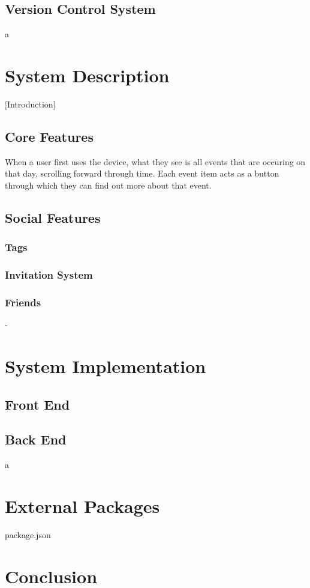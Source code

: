 \documentclass[11pt]{article}
\begin{document}
\subsection {Version Control System}
a
\section {System Description}

[Introduction]
\subsection {Core Features}

When a user first uses the device, what they see is all events that are occuring on that day, scrolling forward through time. Each event item acts as a button through which they can find out more about that event.



\subsection {Social Features}
\subsubsection{Tags}
\subsubsection{Invitation System}
\subsubsection{Friends}



-



\section {System Implementation}
\subsection {Front End}
\subsection {Back End}
a
\section {External Packages}

package.json

\section {Conclusion}
\end{document}
